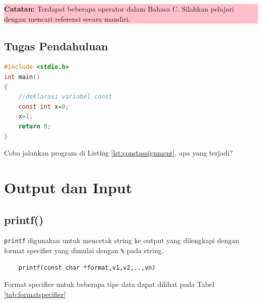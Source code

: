\begin{center}
	\colorbox{pink}{\parbox{0.8\linewidth}{\textbf{Catatan:} Terdapat beberapa operator dalam Bahasa C. Silahkan pelajari dengan mencari referensi secara mandiri.}}
\end{center}
\subsection{Tugas Pendahuluan}
\begin{lstlisting}[language=c,caption=Menggunakan operator penugasan pada variabel const,label=lst:constassignment,captionpos=t]
#include <stdio.h>
int main()
{
    //deklarasi variabel const
    const int x=0;
    x=1;
	return 0;
}
\end{lstlisting} 
Coba jalankan program di Listing \ref{lst:constassignment}, apa yang terjadi?


\section{Output dan Input}

\subsection{printf()}
\verb*|printf|  digunakan untuk mencetak string  ke output yang dilengkapi dengan format specifier yang dimulai dengan \verb*|%| pada string.

\begin{verbatim}
	printf(const char *format,v1,v2,..,vn)
\end{verbatim}

Format specifier untuk beberapa tipe data dapat dilihat pada Tabel \ref{tab:formatspecifier}


